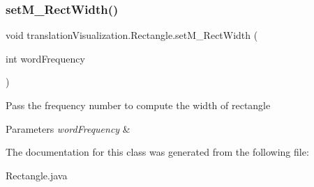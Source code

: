 \subsubsection{\texorpdfstring{set\+M\+\_\+\+Rect\+Width()}{setM\_RectWidth()}}
{\footnotesize\ttfamily void translation\+Visualization.\+Rectangle.\+set\+M\+\_\+\+Rect\+Width (\begin{DoxyParamCaption}\item[{int}]{word\+Frequency }\end{DoxyParamCaption})\hspace{0.3cm}{\ttfamily [inline]}}

Pass the frequency number to compute the width of rectangle 
\begin{DoxyParams}{Parameters}
{\em word\+Frequency} & \\
\hline
\end{DoxyParams}


The documentation for this class was generated from the following file\+:\begin{DoxyCompactItemize}
\item 
Rectangle.\+java\end{DoxyCompactItemize}
